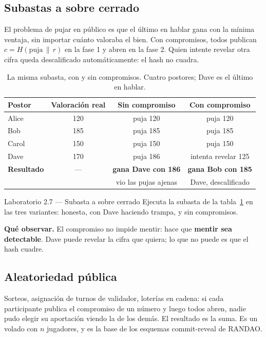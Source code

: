 \documentclass[11pt,a4paper]{article}
\theoremstyle{definition}
\theoremstyle{plain}
\theoremstyle{remark}
\newcommand{\concat}{\,\|\,}
\begin{document}
\subsection{Subastas a sobre cerrado}

El problema de pujar en público es que el último en hablar gana con la mínima
ventaja, sin importar cuánto valoraba el bien. Con compromisos, todos publican
$c = H(\text{puja} \concat r)$ en la fase 1 y abren en la fase 2. Quien intente
revelar otra cifra queda descalificado automáticamente: el hash no cuadra.

\begin{table}[htbp]
\centering\small
\caption{La misma subasta, con y sin compromisos. Cuatro postores; Dave es el
último en hablar.}
\label{tab:subasta}
\begin{tabular}{@{}l c c c@{}}
\toprule
\textbf{Postor} & \textbf{Valoración real} & \textbf{Sin compromiso} &
\textbf{Con compromiso} \\
\midrule
Alice & 120 & puja 120 & puja 120 \\
Bob   & 185 & puja 185 & puja 185 \\
Carol & 150 & puja 150 & puja 150 \\
Dave  & 170 & \textcolor{coralc}{puja 186} & intenta revelar 125 \\
\midrule
\textbf{Resultado} & --- &
  \textcolor{coralc}{\textbf{gana Dave con 186}} &
  \textcolor{mintc}{\textbf{gana Bob con 185}} \\
 & & {\scriptsize vio las pujas ajenas} & {\scriptsize Dave, descalificado} \\
\bottomrule
\end{tabular}
\end{table}

\begin{laboratorio}{Laboratorio 2.7 — Subasta a sobre cerrado}
Ejecuta la subasta de la tabla~\ref{tab:subasta} en las tres variantes: honesta,
con Dave haciendo trampa, y sin compromisos.

\textbf{Qué observar.} El compromiso no impide mentir: hace que \textbf{mentir
sea detectable}. Dave puede revelar la cifra que quiera; lo que no puede es que
el hash cuadre.
\end{laboratorio}

\subsection{Aleatoriedad pública}

Sorteos, asignación de turnos de validador, loterías en cadena: si cada
participante publica el compromiso de un número y luego todos abren, nadie pudo
elegir su aportación viendo la de los demás. El resultado es la suma. Es un
volado con $n$ jugadores, y es la base de los esquemas commit-reveal de RANDAO.
\end{document}
